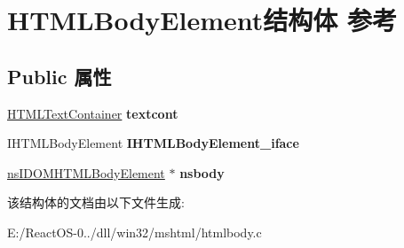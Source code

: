 \hypertarget{struct_h_t_m_l_body_element}{}\section{H\+T\+M\+L\+Body\+Element结构体 参考}
\label{struct_h_t_m_l_body_element}
\subsection*{Public 属性}
\begin{DoxyCompactItemize}
\item 
\mbox{\label{struct_h_t_m_l_body_element_a515b80829627a901e51480a98021f6ae}} 
\hyperlink{struct_h_t_m_l_text_container}{H\+T\+M\+L\+Text\+Container} {\bfseries textcont}
\item 
\mbox{\label{struct_h_t_m_l_body_element_abfc14a26a517defb068135a09d45aab3}} 
I\+H\+T\+M\+L\+Body\+Element {\bfseries I\+H\+T\+M\+L\+Body\+Element\+\_\+iface}
\item 
\mbox{\label{struct_h_t_m_l_body_element_a71fd4d3cf27d701174b3177fdd0bbc6a}} 
\hyperlink{interfacens_i_d_o_m_h_t_m_l_body_element}{ns\+I\+D\+O\+M\+H\+T\+M\+L\+Body\+Element} $\ast$ {\bfseries nsbody}
\end{DoxyCompactItemize}


该结构体的文档由以下文件生成\+:\begin{DoxyCompactItemize}
\item 
E\+:/\+React\+O\+S-\/0../dll/win32/mshtml/htmlbody.\+c\end{DoxyCompactItemize}
